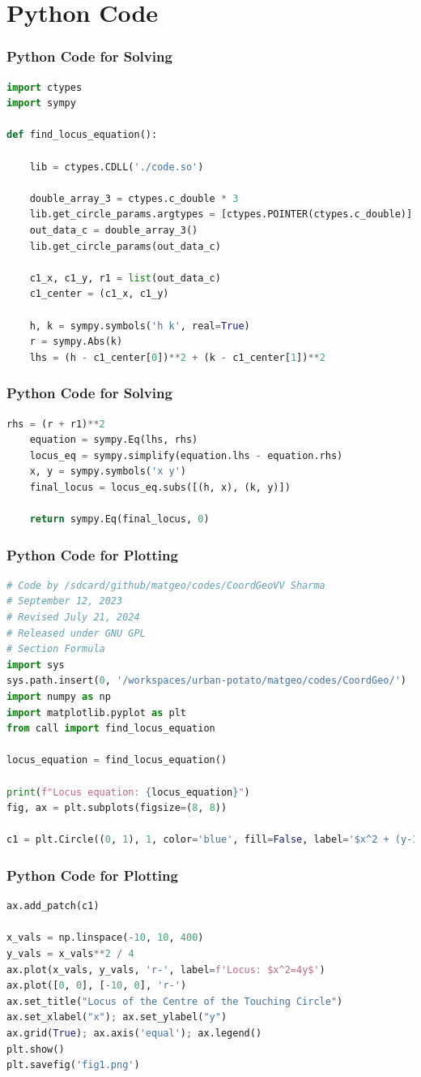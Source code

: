 \documentclass{beamer}
\theoremstyle{remark}
\numberwithin{equation}{section}
\begin{document}
\section{Python Code}
\begin{frame}[fragile]
\frametitle{Python Code for Solving}
\begin{lstlisting}[language=Python]
import ctypes
import sympy

def find_locus_equation():
     
    lib = ctypes.CDLL('./code.so')
   
    double_array_3 = ctypes.c_double * 3
    lib.get_circle_params.argtypes = [ctypes.POINTER(ctypes.c_double)]
    out_data_c = double_array_3()
    lib.get_circle_params(out_data_c)
     
    c1_x, c1_y, r1 = list(out_data_c)
    c1_center = (c1_x, c1_y)
 
    h, k = sympy.symbols('h k', real=True)
    r = sympy.Abs(k)
    lhs = (h - c1_center[0])**2 + (k - c1_center[1])**2

\end{lstlisting}
\end{frame}
\begin{frame}[fragile]
\frametitle{Python Code for Solving}
\begin{lstlisting}[language=Python]
   rhs = (r + r1)**2
    equation = sympy.Eq(lhs, rhs)
    locus_eq = sympy.simplify(equation.lhs - equation.rhs)
    x, y = sympy.symbols('x y')
    final_locus = locus_eq.subs([(h, x), (k, y)])
    
    return sympy.Eq(final_locus, 0)
\end{lstlisting}
\end{frame}
\begin{frame}[fragile]
\frametitle{Python Code for Plotting}
\begin{lstlisting}[language=Python]
# Code by /sdcard/github/matgeo/codes/CoordGeoVV Sharma
# September 12, 2023
# Revised July 21, 2024
# Released under GNU GPL
# Section Formula
import sys
sys.path.insert(0, '/workspaces/urban-potato/matgeo/codes/CoordGeo/') 
import numpy as np
import matplotlib.pyplot as plt
from call import find_locus_equation  

locus_equation = find_locus_equation()
 
print(f"Locus equation: {locus_equation}")
fig, ax = plt.subplots(figsize=(8, 8))
  
c1 = plt.Circle((0, 1), 1, color='blue', fill=False, label='$x^2 + (y-1)^2 = 1$')

\end{lstlisting}
\end{frame}
\begin{frame}[fragile]
\frametitle{Python Code for Plotting}
\begin{lstlisting}[language=Python]
ax.add_patch(c1)
 
x_vals = np.linspace(-10, 10, 400)
y_vals = x_vals**2 / 4
ax.plot(x_vals, y_vals, 'r-', label=f'Locus: $x^2=4y$')
ax.plot([0, 0], [-10, 0], 'r-') 
ax.set_title("Locus of the Centre of the Touching Circle")
ax.set_xlabel("x"); ax.set_ylabel("y")
ax.grid(True); ax.axis('equal'); ax.legend()
plt.show()
plt.savefig('fig1.png')
\end{lstlisting}
\end{frame}
\end{document}
